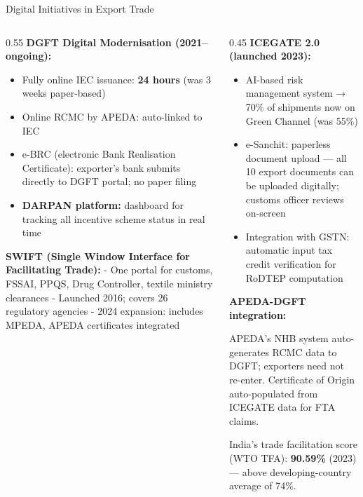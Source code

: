 \documentclass[
  ignorenonframetext,
  aspectratio=169,
]{beamer}
\makeatletter
\providecommand{\tightlist}{%
  \setlength{\itemsep}{0pt}\setlength{\parskip}{0pt}}
\let\quarto@originallabel\label
\DeclareRobustCommand*{\label}[1]{\quarto@originallabel{#1}}
\makeatother
\begin{document}
\begin{frame}
\begin{block}{Digital Initiatives in Export Trade}
\label{digital-initiatives-in-export-trade}
\begin{columns}[T]
\begin{column}{0.55\linewidth}
\textbf{DGFT Digital Modernisation (2021--ongoing):}

\begin{itemize}
\tightlist
\item
  Fully online IEC issuance: \textbf{24 hours} (was 3 weeks paper-based)
\item
  Online RCMC by APEDA: auto-linked to IEC
\item
  e-BRC (electronic Bank Realisation Certificate): exporter's bank
  submits directly to DGFT portal; no paper filing
\item
  \textbf{DARPAN platform:} dashboard for tracking all incentive scheme
  status in real time
\end{itemize}

\textbf{SWIFT (Single Window Interface for Facilitating Trade):} - One
portal for customs, FSSAI, PPQS, Drug Controller, textile ministry
clearances - Launched 2016; covers 26 regulatory agencies - 2024
expansion: includes MPEDA, APEDA certificates integrated
\end{column}

\begin{column}{0.45\linewidth}
\textbf{ICEGATE 2.0 (launched 2023):}

\begin{itemize}
\tightlist
\item
  AI-based risk management system → 70\% of shipments now on Green
  Channel (was 55\%)
\item
  e-Sanchit: paperless document upload --- all 10 export documents can
  be uploaded digitally; customs officer reviews on-screen
\item
  Integration with GSTN: automatic input tax credit verification for
  RoDTEP computation
\end{itemize}

\textbf{APEDA-DGFT integration:}

APEDA's NHB system auto-generates RCMC data to DGFT; exporters need not
re-enter. Certificate of Origin auto-populated from ICEGATE data for FTA
claims.

India's trade facilitation score (WTO TFA): \textbf{90.59\%} (2023) ---
above developing-country average of 74\%.
\end{column}
\end{columns}
\end{block}
\end{frame}
\end{document}
